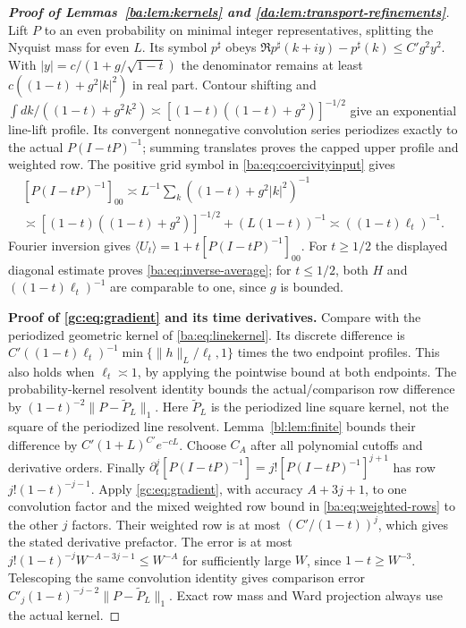 \documentclass[11pt]{article}
\numberwithin{equation}{section}
\theoremstyle{remark}
\begin{document}
\begin{proof}[\textbf{Proof of Lemmas~\ref{ba:lem:kernels} and \ref{da:lem:transport-refinements}}]
Lift $P$ to an even probability on minimal integer representatives,
splitting the Nyquist mass for even $L$. Its symbol $p^\sharp$ obeys
$\Re p^\sharp(k+iy)-p^\sharp(k)\le C'g^2y^2$.
With $|y|=c/(1+g/\sqrt{1-t})$ the denominator remains at least
$c((1-t)+g^2|k|^2)$ in real part. Contour shifting and
$\int dk/((1-t)+g^2k^2)\asymp[(1-t)((1-t)+g^2)]^{-1/2}$
give an exponential line-lift profile. Its convergent nonnegative
convolution series periodizes exactly to the actual $P(I-tP)^{-1}$;
summing translates proves the capped upper profile and weighted row.
The positive grid symbol in \eqref{ba:eq:coercivityinput} gives
\[
 \begin{gathered}
 [P(I-tP)^{-1}]_{00}
 \asymp L^{-1}\sum_k((1-t)+g^2|k|^2)^{-1}\\
 \asymp[(1-t)((1-t)+g^2)]^{-1/2}+(L(1-t))^{-1}
 \asymp((1-t)\ell_t)^{-1}.
 \end{gathered}
\]
Fourier inversion gives
$\langle U_t\rangle=1+t[P(I-tP)^{-1}]_{00}$.
For $t\ge1/2$ the displayed diagonal estimate proves
\eqref{ba:eq:inverse-average}; for $t\le1/2$, both $H$ and
$((1-t)\ell_t)^{-1}$ are comparable to one, since $g$ is bounded.

\noindent\textbf{Proof of \eqref{gc:eq:gradient} and its time derivatives.}
Compare with the periodized geometric
kernel of \eqref{ba:eq:linekernel}. Its discrete difference is
$C'((1-t)\ell_t)^{-1}\min\{\|h\|_L/\ell_t,1\}$ times the two endpoint
profiles. This also holds when $\ell_t\asymp1$, by applying the pointwise
bound at both endpoints.
The probability-kernel resolvent identity bounds the actual/comparison
row difference by
$(1-t)^{-2}\|P-\widetilde P_L\|_1$.
Here $\widetilde P_L$ is the periodized line square kernel, not
the square of the periodized line resolvent. Lemma~\ref{bl:lem:finite}
bounds their difference by $C'(1+L)^{C'}e^{-cL}$.
Choose $C_A$ after all polynomial cutoffs and derivative orders.
Finally $\partial_t^j[P(I-tP)^{-1}]=j![P(I-tP)^{-1}]^{j+1}$ has row
$j!(1-t)^{-j-1}$. Apply \eqref{gc:eq:gradient}, with accuracy
$A+3j+1$, to one convolution factor and the mixed weighted row bound
in \eqref{ba:eq:weighted-rows} to the other $j$ factors. Their weighted
row is at most $(C'/(1-t))^j$, which gives the stated derivative
prefactor. The error is at most $j!(1-t)^{-j}W^{-A-3j-1}\le W^{-A}$
for sufficiently large $W$, since $1-t\ge W^{-3}$.
Telescoping the same convolution identity gives comparison error
$C'_j(1-t)^{-j-2}\|P-\widetilde P_L\|_1$.
Exact row mass and Ward projection
always use the actual kernel.
\end{proof}
\end{document}
